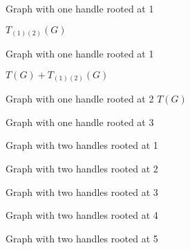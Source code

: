 \documentclass[xcolor=dvipsnames]{beamer}
\numberwithin{equation}{section} \DeclareMathOperator{\Var}{Var}
\begin{document}
\begin{frame}{Graph with one handle rooted at 1}

\(T_{(1)(2)}(G)\)

\end{frame}


\begin{frame}{Graph with one handle rooted at 1}

\(T(G)+T_{(1)(2)}(G)\)

\end{frame}


\begin{frame}{Graph with one handle rooted at 2}
\(T(G)\)
\end{frame}


\begin{frame}{Graph with one handle rooted at 3}

\end{frame}


\begin{frame}{Graph with two handles rooted at 1 }

\end{frame}


\begin{frame}{Graph with two handles rooted at 2 }

\end{frame}


\begin{frame}{Graph with two handles rooted at 3}
\end{frame}


\begin{frame}{Graph with two handles rooted at 4}

\end{frame}


\begin{frame}{Graph with two handles rooted at 5}

\end{frame}

\end{document}
